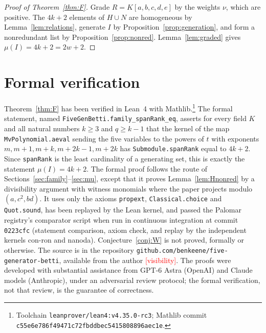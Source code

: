 \documentclass[11pt,letterpaper]{article}
\numberwithin{equation}{section}
\newcommand{\red}[1]{\textcolor{red}{#1}}
\theoremstyle{plain}
\theoremstyle{remark}
\begin{document}
\begin{proof}[Proof of Theorem~\ref{thm:F}]
Grade $R=K[a,b,c,d,e]$ by the weights $\nu$, which are positive. The $4k+2$ elements of $H\cup N$ are homogeneous by Lemma~\ref{lem:relations}, generate $I$ by Proposition~\ref{prop:generation}, and form a nonredundant list by Proposition~\ref{prop:nonred}. Lemma~\ref{lem:graded} gives $\mu(I)=4k+2=2w+2$.
\end{proof}

\section{Formal verification}\label{sec:lean}

Theorem~\ref{thm:F} has been verified in Lean~4 with Mathlib.\footnote{Toolchain \texttt{leanprover/lean4:v4.35.0-rc3}; Mathlib commit \texttt{c55e6e786f49471c72fbddbec5415808896aec1e}.} The formal statement, named \texttt{FiveGenBetti.family\_spanRank\_eq}, asserts for every field $K$ and all natural numbers $k\ge 3$ and $q\ge k-1$ that the kernel of the map \texttt{MvPolynomial.aeval} sending the five variables to the powers of $t$ with exponents $m,m+1,m+k,m+2k-1,m+2k$ has \texttt{Submodule.spanRank} equal to $4k+2$. Since \texttt{spanRank} is the least cardinality of a generating set, this is exactly the statement $\mu(I)=4k+2$. The formal proof follows the route of Sections~\ref{sec:family}--\ref{sec:mu}, except that it proves Lemma~\ref{lem:Hnonred} by a divisibility argument with witness monomials where the paper projects modulo $(a,c^2,bd)$. It uses only the axioms \texttt{propext}, \texttt{Classical.choice} and \texttt{Quot.sound}, has been replayed by the Lean kernel, and passed the Palomar registry's comparator script when run in continuous integration at commit \texttt{0223cfc} (statement comparison, axiom check, and replay by the independent kernels con-ron and nanoda). Conjecture~\ref{conj:W} is not proved, formally or otherwise. The source is in the repository \texttt{github.com/benkeene/five-generator-betti}, available from the author \red{[visibility]}. The proofs were developed with substantial assistance from GPT-6 Astra (OpenAI) and Claude models (Anthropic), under an adversarial review protocol; the formal verification, not that review, is the guarantee of correctness.

\enlargethispage{3\baselineskip}


\end{document}
